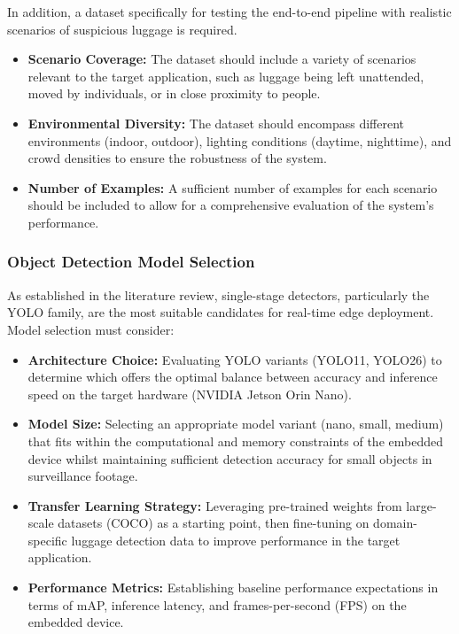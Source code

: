 In addition, a dataset specifically for testing the end-to-end pipeline with
realistic scenarios of suspicious luggage is required.

\begin{itemize}
	\item \textbf{Scenario Coverage:}\label{req:scenario_coverage} The dataset should include a variety of
	      scenarios relevant to the target application, such as luggage being
	      left unattended, moved by individuals, or in close proximity to
	      people.
	\item \textbf{Environmental Diversity:}\label{req:env_diversity} The dataset should encompass
	      different environments (indoor, outdoor), lighting conditions (daytime,
	      nighttime), and crowd densities to ensure the robustness of the system.
	\item \textbf{Number of Examples:}\label{req:num_examples} A sufficient number of examples for each scenario should
	      be included to allow for a comprehensive evaluation of the system's
	      performance.
\end{itemize}

\subsubsection{Object Detection Model Selection}

As established in the literature review, single-stage detectors, particularly
the YOLO family, are the most suitable candidates for real-time edge
deployment. Model selection must consider:

\begin{itemize}
	\item \textbf{Architecture Choice:}\label{req:arch_choice} Evaluating YOLO variants (YOLO11,
	      YOLO26) to determine which offers the optimal balance between
	      accuracy and inference speed on the target hardware (NVIDIA Jetson
	      Orin Nano).
	\item \textbf{Model Size:}\label{req:model_size} Selecting an appropriate model variant (nano,
	      small, medium) that fits within the computational and memory
	      constraints of the embedded device whilst maintaining sufficient
	      detection accuracy for small objects in surveillance footage.
	\item \textbf{Transfer Learning Strategy:}\label{req:transfer_learning} Leveraging pre-trained weights
	      from large-scale datasets (COCO) as a starting point, then fine-tuning
	      on domain-specific luggage detection data to improve performance in
	      the target application.
	\item \textbf{Performance Metrics:}\label{req:perf_metrics} Establishing baseline performance
	      expectations in terms of mAP, inference latency, and frames-per-second
	      (FPS) on the embedded device.
\end{itemize}

